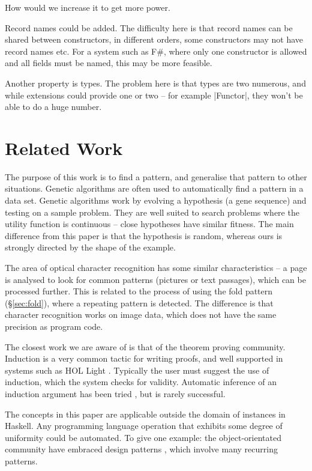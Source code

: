 \documentclass[preprint]{sigplanconf}
\begin{document}
How would we increase it to get more power.

Record names could be added. The difficulty here is that record names can be shared between constructors, in different orders, some constructors may not have record names etc. For a system such as F#, where only one constructor is allowed and all fields must be named, this may be more feasible.

Another property is types. The problem here is that types are two numerous, and while extensions could provide one or two -- for example |Functor|, they won't be able to do a huge number.

\section{Related Work}
\label{sec:related}

The purpose of this work is to find a pattern, and generalise that pattern to other situations. Genetic algorithms \cite{genetic_algorithms} are often used to automatically find a pattern in a data set. Genetic algorithms work by evolving a hypothesis (a gene sequence) and testing on a sample problem. They are well suited to search problems where the utility function is continuous -- close hypotheses have similar fitness. The main difference from this paper is that the hypothesis is random, whereas ours is strongly directed by the shape of the example.

The area of optical character recognition \cite{ocr} has some similar characteristics -- a page is analysed to look for common patterns (pictures or text passages), which can be processed further. This is related to the process of using the fold pattern (\S\ref{sec:fold}), where a repeating pattern is detected. The difference is that character recognition works on image data, which does not have the same precision as program code.

The closest work we are aware of is that of the theorem proving community. Induction is a very common tactic for writing proofs, and well supported in systems such as HOL Light \cite{hol_light}. Typically the user must suggest the use of induction, which the system checks for validity. Automatic inference of an induction argument has been tried \cite{mintchev:reasoning}, but is rarely successful.

The concepts in this paper are applicable outside the domain of instances in Haskell. Any programming language operation that exhibits some degree of uniformity could be automated. To give one example: the object-orientated community have embraced design patterns \cite{design_patterns}, which involve many recurring patterns.
\end{document}
